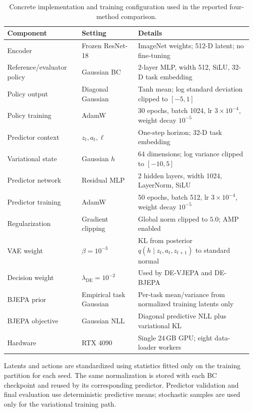 \documentclass[10pt,twocolumn]{article}
\theoremstyle{tightstyle}
\begin{document}
\begin{table}[t]
\centering
\caption{Concrete implementation and training configuration used in the reported
four-method comparison.}
\label{tab:implementation-details}
\small
\setlength{\tabcolsep}{5pt}
\begin{tabular}{@{}lll@{}}
\toprule
\textbf{Component} & \textbf{Setting} & \textbf{Details} \\
\midrule
Encoder & Frozen ResNet-18 & ImageNet weights; 512-D latent; no fine-tuning \\
Reference/evaluator policy & Gaussian BC & 2-layer MLP, width 512, SiLU,
32-D task embedding \\
Policy output & Diagonal Gaussian & Tanh mean; log standard deviation clipped
to $[-5,1]$ \\
Policy training & AdamW & 30 epochs, batch 1024, lr $3{\times}10^{-4}$,
weight decay $10^{-5}$ \\
Predictor context & $z_t,a_t,\ell$ & One-step horizon; 32-D task embedding \\
Variational state & Gaussian $h$ & 64 dimensions; log variance clipped to
$[-10,5]$ \\
Predictor network & Residual MLP & 2 hidden layers, width 1024, LayerNorm, SiLU \\
Predictor training & AdamW & 50 epochs, batch 512, lr $3{\times}10^{-4}$,
weight decay $10^{-5}$ \\
Regularization & Gradient clipping & Global norm clipped to $5.0$; AMP enabled \\
VAE weight & $\beta=10^{-3}$ & KL from posterior $q(h\mid z_t,a_t,z_{t+1})$
to standard normal \\
Decision weight & $\lambda_{\mathrm{DE}}=10^{-2}$ & Used by DE-VJEPA and
DE-BJEPA \\
BJEPA prior & Empirical task Gaussian & Per-task mean/variance from normalized
training latents only \\
BJEPA objective & Gaussian NLL & Diagonal predictive NLL plus variational KL \\
Hardware & RTX 4090 & Single 24\,GB GPU; eight data-loader workers \\
\bottomrule
\end{tabular}
\end{table}

Latents and actions are standardized using statistics fitted only on the training
partition for each seed. The same normalization is stored with each BC checkpoint
and reused by its corresponding predictor. Predictor validation and final
evaluation use deterministic predictive means; stochastic samples are used only
for the variational training path.
\end{document}
